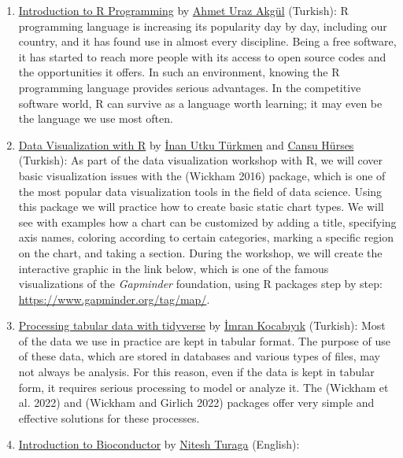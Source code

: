 \begin{enumerate}
\def\labelenumi{\arabic{enumi}.}
\item
  \href{https://www.youtube.com/watch?v=jZTTjVNQRys}{Introduction to R Programming} by \href{https://twitter.com/rpydaneogrendim}{Ahmet Uraz Akgül} (Turkish):
  R programming language is increasing its popularity day by day, including our country, and it has found use in almost every discipline. Being a free software, it has started to reach more people with its access to open source codes and the opportunities it offers. In such an environment, knowing the R programming language provides serious advantages. In the competitive software world, R can survive as a language worth learning; it may even be the language we use most often.
\item
  \href{https://www.youtube.com/watch?v=cY8bBMKVizs}{Data Visualization with R} by \href{https://www.linkedin.com/in/inan-utku-turkmen/}{İnan Utku Türkmen} and \href{https://www.linkedin.com/in/cansu-h\%C3\%BCrses-7b7462176/}{Cansu Hürses} (Turkish):
  As part of the data visualization workshop with R, we will cover basic visualization issues with the  (Wickham 2016) package, which is one of the most popular data visualization tools in the field of data science. Using this package we will practice how to create basic static chart types. We will see with examples how a chart can be customized by adding a title, specifying axis names, coloring according to certain categories, marking a specific region on the chart, and taking a section. During the workshop, we will create the interactive graphic in the link below, which is one of the famous visualizations of the \emph{Gapminder} foundation, using R packages step by step: \url{https://www.gapminder.org/tag/map/}.
\item
  \href{https://www.youtube.com/watch?v=SzhnjbsFe4o}{Processing tabular data with tidyverse} by \href{https://www.linkedin.com/in/imrankocabiyik/}{İmran Kocabıyık} (Turkish):
  Most of the data we use in practice are kept in tabular format. The purpose of use of these data, which are stored in databases and various types of files, may not always be analysis. For this reason, even if the data is kept in tabular form, it requires serious processing to model or analyze it. The  (Wickham et al. 2022) and  (Wickham and Girlich 2022) packages offer very simple and effective solutions for these processes.
\item
  \href{https://www.youtube.com/watch?v=r_X7_35aDMI}{Introduction to Bioconductor} by \href{https://www.linkedin.com/in/niteshturaga/}{Nitesh Turaga} (English):

\end{enumerate}
